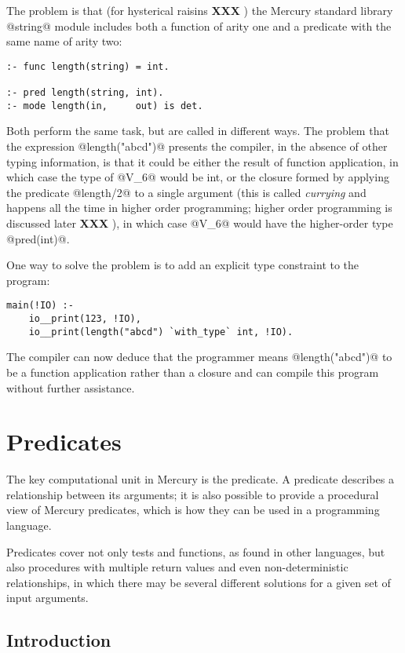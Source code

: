 \documentclass[a4paper,11pt,notitlepage,onecolumn]{article}
\newcommand{\XXX}[1]%
{{\small\textbf{XXX} \emph{#1}}}
\begin{document}
The problem is that (for hysterical raisins \XXX{}) the Mercury
standard library @string@ module includes both a function of
arity one and a predicate with the same name of arity two:
\begin{verbatim}
:- func length(string) = int.

:- pred length(string, int).
:- mode length(in,     out) is det.
\end{verbatim}
Both perform the same task, but are called in different ways.
The problem that the expression @length("abcd")@ presents the
compiler, in the absence of other typing information, is that
it could be either the result of function application, in
which case the type of @V_6@ would be int, or the closure formed
by applying the predicate @length/2@ to a single argument (this
is called \emph{currying} and happens all the time in higher order
programming; higher order programming is discussed later
\XXX{}), in which case @V_6@ would have the higher-order type
@pred(int)@.

One way to solve the problem is to add an explicit type
constraint to the program:
\begin{verbatim}
main(!IO) :-
    io__print(123, !IO),
    io__print(length("abcd") `with_type` int, !IO).
\end{verbatim}
The compiler can now deduce that the programmer means
@length("abcd")@ to be a function application rather than a
closure and can compile this program without further
assistance.




\section{Predicates}

The key computational unit in Mercury is the predicate.  A
predicate describes a relationship between its arguments; it is
also possible to provide a procedural view of Mercury predicates,
which is how they can be used in a programming language.

Predicates cover not only tests and functions, as found in other
languages, but also procedures with multiple return values and
even non-deterministic relationships, in which there may be
several different solutions for a given set of input arguments.

\subsection{Introduction}
\end{document}
